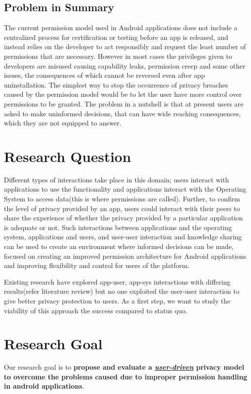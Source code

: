 \subsection{Problem in Summary}
The current permission model used in Android applications does not include a centralized process for certification or testing before an app is released, and instead relies on the developer to act responsibly and request the least number of permissions that are necessary. However in most cases the privileges given to developers are misused causing capability leaks, permission creep and some other issues, the consequences of which cannot be reversed even after app uninstallation. The simplest way to stop the occurrence of privacy breaches caused by the permission model would be to let the user have more control over permissions to be granted. The problem in a nutshell is that at present users are asked to make uninformed decisions, that can have wide reaching consequences, which they are not equipped to answer.


\section{Research Question}
Different types of interactions take place in this domain; users interact with applications to use the functionality and applications interact with the Operating System to access data(this is where permissions are called). Further, to confirm the level of privacy provided by an app, users could interact with their peers to share the experience of whether the privacy provided by a particular application is adequate or not. Such interactions between applications and the operating system, applications and users, and user-user interaction and knowledge sharing can be used to create an environment where informed decisions can be made, focused on creating an improved permission architecture for Android applications and improving flexibility and control for users of the platform.
\smallskip 

Existing research have explored app-user, app-sys interactions with differing results(refer literature review) but no one exploited the user-user interaction to give better privacy protection to users. As a first step, we want to study the viability of this approach the success compared to status quo. 
\smallskip

\section{Research Goal}
Our research goal is to \textbf{propose and evaluate a \emph{\underline{user-driven}} privacy model to overcome the problems caused due to improper permission handling in android applications}. 


